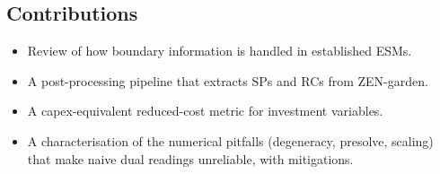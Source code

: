\subsection{Contributions}
\label{sec:contributions}
\begin{itemize}
	\item Review of how boundary information is handled in established \acp{ESM}.
	\item A post-processing pipeline that extracts \aclp{SP} and \aclp{RC} from
	ZEN-garden.
	\item A capex-equivalent reduced-cost metric for investment variables.
	\item A characterisation of the numerical pitfalls (degeneracy, presolve,
	scaling) that make naive dual readings unreliable, with mitigations.
\end{itemize}
